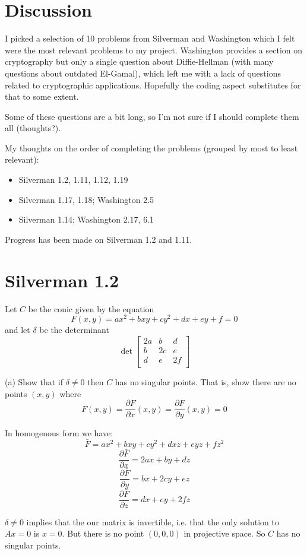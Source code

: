 \documentclass{article}
\begin{document}
\section*{Discussion}
I picked a selection of 10 problems from Silverman and Washington which I felt were the most relevant problems to my project. Washington provides a section on cryptography but only a single question about Diffie-Hellman (with many questions about outdated El-Gamal), which left me with a lack of questions related to cryptographic applications. Hopefully the coding aspect substitutes for that to some extent.

Some of these questions are a bit long, so I'm not sure if I should complete them all (thoughts?).

My thoughts on the order of completing the problems (grouped by most to least relevant):
\begin{itemize}
\item Silverman 1.2, 1.11, 1.12, 1.19
\item Silverman 1.17, 1.18; Washington 2.5
\item Silverman 1.14; Washington 2.17, 6.1
\end{itemize}

Progress has been made on Silverman 1.2 and 1.11.

\section{Silverman 1.2}
Let $C$ be the conic given by the equation
$$F(x,y) = ax^2 + bxy + cy^2 + dx + ey + f = 0$$
and let $\delta$ be the determinant
$$\det \begin{bmatrix}
2a & b & d \\
b & 2c & e \\
d & e & 2f \\
\end{bmatrix}$$

(a) Show that if $\delta \neq 0$ then $C$ has no singular points. That is, show there are no points $(x,y)$ where
$$F(x,y) = \frac{\partial F}{\partial x}(x,y) = \frac{\partial F}{\partial y}(x,y) = 0$$

In homogenous form we have:
$$\bar F = ax^2 + bxy + cy^2 + dxz + eyz + fz^2$$
$$\frac{\partial \bar F}{\partial x} = 2ax + by + dz$$
$$\frac{\partial \bar F}{\partial y} = bx + 2cy + ez$$
$$\frac{\partial \bar F}{\partial z} = dx + ey + 2fz$$

$\delta \neq 0$ implies that the our matrix is invertible, i.e. that the only solution to $Ax = 0$ is $x = 0$. But there is no point $(0,0,0)$ in projective space. So $C$ has no singular points.
\end{document}
